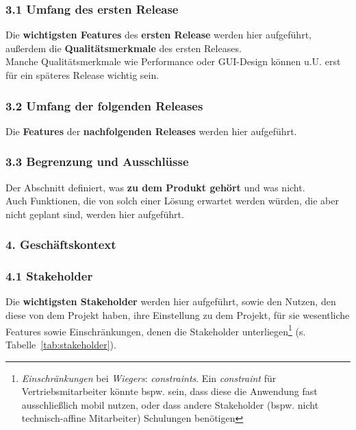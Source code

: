 \subsubsection*{3.1 Umfang des ersten Release}
Die \textbf{wichtigsten Features} des \textbf{ersten Release} werden hier aufgeführt, außerdem die \textbf{Qualitätsmerkmale} des ersten Releases.\\
Manche Qualitätsmerkmale wie Performance oder GUI-Design können u.U. erst für ein späteres Release wichtig sein.

\subsubsection*{3.2 Umfang der folgenden Releases}
Die \textbf{Features} der \textbf{nachfolgenden Releases} werden hier aufgeführt.

\subsubsection*{3.3 Begrenzung und Ausschlüsse}
Der Abschnitt definiert, was \textbf{zu dem Produkt gehört} und was nicht.\\
Auch Funktionen, die von  solch einer Lösung erwartet werden würden, die aber nicht geplant sind, werden hier aufgeführt.

\subsubsection*{4. Geschäftskontext}

\subsubsection*{4.1 Stakeholder}
Die \textbf{wichtigsten Stakeholder} werden hier aufgeführt, sowie den Nutzen, den diese von dem Projekt haben, ihre Einstellung zu dem Projekt, für sie wesentliche Features sowie Einschränkungen, denen die Stakeholder unterliegen\footnote{
\textit{Einschränkungen} bei \textit{Wiegers}: \textit{constraints}. Ein \textit{constraint} für Vertriebsmitarbeiter könnte bspw. sein, dass diese die Anwendung fast ausschließlich mobil nutzen, oder dass andere Stakeholder (bspw. nicht technisch-affine Mitarbeiter) Schulungen benötigen
} (s. Tabelle~\ref{tab:stakeholder}).


